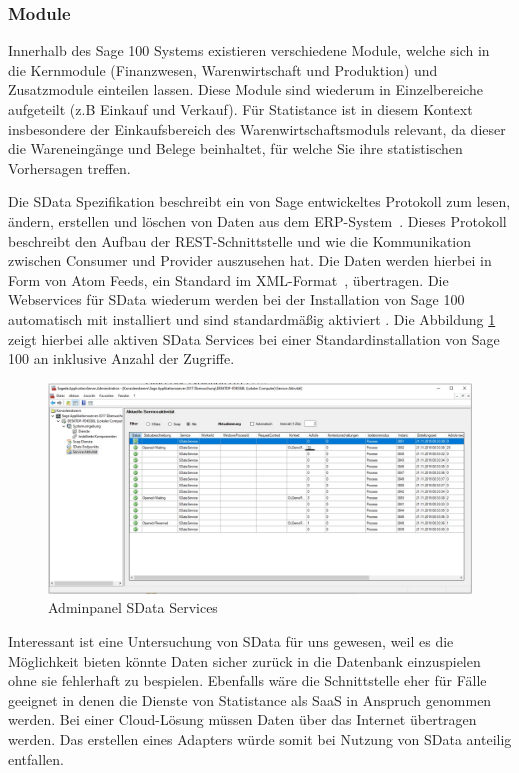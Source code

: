\subsubsection*{Module}

Innerhalb des Sage 100 Systems existieren verschiedene Module, welche sich in die Kernmodule (Finanzwesen, Warenwirtschaft und Produktion) und Zusatzmodule einteilen lassen. Diese Module sind wiederum in Einzelbereiche aufgeteilt (z.B Einkauf und Verkauf). Für Statistance ist in diesem Kontext insbesondere der Einkaufsbereich des Warenwirtschaftsmoduls relevant, da dieser die Wareneingänge und Belege beinhaltet, für welche Sie ihre statistischen Vorhersagen treffen.

Die SData Spezifikation beschreibt ein von Sage entwickeltes Protokoll zum lesen, ändern, erstellen und löschen von Daten aus dem ERP-System~\cite{sdatadocu}. Dieses Protokoll beschreibt den Aufbau der REST-Schnittstelle und wie die Kommunikation zwischen Consumer und Provider auszusehen hat. Die Daten werden hierbei in Form von Atom Feeds, ein Standard im XML-Format~\cite{atomfeed}, übertragen. Die Webservices für SData wiederum werden bei der Installation von Sage 100 automatisch mit installiert und sind standardmäßig aktiviert \cite{sageadministrationshandbuch}. Die Abbildung \ref{fig:sdataservicesadmin} zeigt hierbei alle aktiven SData Services bei einer Standardinstallation von Sage 100 an inklusive Anzahl der Zugriffe.

\begin{figure}[!h]
\centering
\includegraphics[width=12cm]{images/0x_requirement_analysis/sage-admin-sdata.png}
\caption{Adminpanel SData Services}
\label{fig:sdataservicesadmin}
\end{figure}

Interessant ist eine Untersuchung von SData für uns gewesen, weil es die Möglichkeit bieten könnte Daten sicher zurück in die Datenbank einzuspielen ohne sie fehlerhaft zu bespielen. Ebenfalls wäre die Schnittstelle eher für Fälle geeignet in denen die Dienste von Statistance als SaaS in Anspruch genommen werden. Bei einer Cloud-Lösung müssen Daten über das Internet übertragen werden. Das erstellen eines Adapters würde somit bei Nutzung von SData anteilig entfallen.

